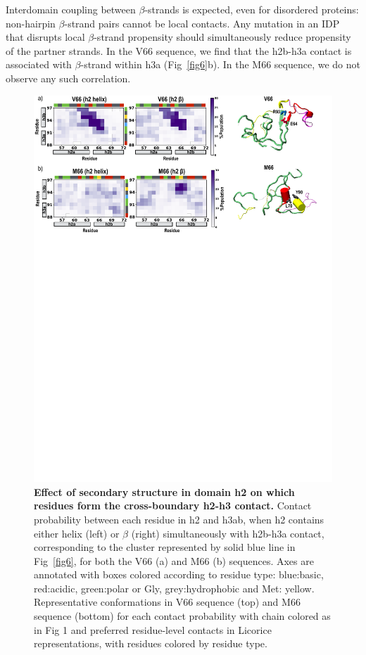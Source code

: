 \documentclass[10pt,letterpaper]{article}
\begin{document}
Interdomain coupling between $\beta$-strands is expected, even for disordered proteins: non-hairpin $\beta$-strand pairs cannot be local contacts. Any mutation in an IDP that disrupts local $\beta$-strand propensity should simultaneously reduce propensity of the partner strands. In the V66 sequence, we find that the h2b-h3a contact is associated with $\beta$-strand within h3a (Fig~\ref{fig6}b). In the M66 sequence, we do not observe any such correlation.
\begin{figure}[!ht]
\includegraphics[scale=0.5,width=\textwidth,trim={0 0cm 0 0cm},clip]{../figures/fig7.pdf}
\caption{{\bf Effect of secondary structure in domain h2 on which residues form the cross-boundary h2-h3 contact.} Contact probability between each residue in h2 and h3ab, when h2 contains either helix (left) or $\beta$ (right) simultaneously with h2b-h3a contact, corresponding to the cluster represented by solid blue line in Fig~\ref{fig6}, for both the V66 (a) and M66 (b) sequences. Axes are annotated with boxes colored according to residue type: blue:basic, red:acidic, green:polar or Gly, grey:hydrophobic and Met: yellow. Representative conformations in V66 sequence (top) and M66 sequence (bottom) for each contact probability with chain colored as in Fig 1 and preferred residue-level contacts in Licorice representations, with residues colored by residue type.}
\label{fig7}
\end{figure}
\end{document}

